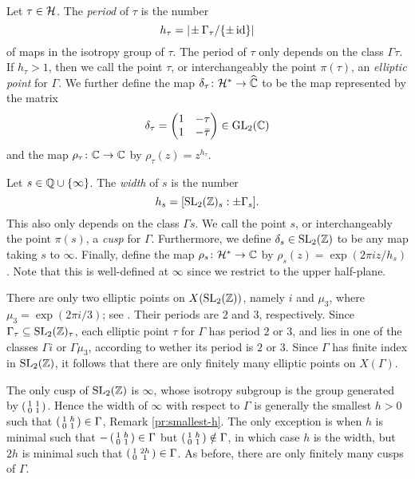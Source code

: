 \begin{defi} \label{df:period-width} \ 

  Let $\tau\in\mathcal{H}$. The \emph{period} of $\tau$ is the number \[h_\tau=|\!\pm\Gamma_\tau/\{\pm\operatorname{id}\}|\] of maps in the isotropy group of $\tau$. The period of $\tau$ only depends on the class $\Gamma\tau$. If $h_\tau > 1$, then we call the point $\tau$, or interchangeably the point $\pi(\tau)$, an \emph{elliptic point} for $\Gamma$. We further define the map $\delta_\tau\colon\mathcal{H}^*\to\widehat{\mathbb{C}}$ to be the map represented by the matrix
 \[\delta_\tau = \begin{pmatrix}1 & -\tau \\ 1 & -\bar{\tau}\end{pmatrix}\in\operatorname{GL}_2(\mathbb{C})\] and the map $\rho_\tau\colon\mathbb{C}\to\mathbb{C}$ by $\rho_\tau(z)=z^{h_\tau}.$
 
  Let $s\in\mathbb{Q}\cup\{\infty\}$. The \emph{width} of $s$ is the number \[h_s=[\operatorname{SL}_2(\mathbb{Z})_s:\pm\Gamma_s].\] This also only depends on the class $\Gamma s$. We call the point $s$, or interchangeably the point $\pi(s)$, a \emph{cusp} for $\Gamma$. Furthermore, we define $\delta_s\in\operatorname{SL}_2(\mathbb{Z})$ to be any map taking $s$ to $\infty$. Finally, define the map $\rho_s\colon\mathcal{H}^*\to\mathbb{C}$ by $\rho_s(z)=\exp(2\pi iz/h_s)$. Note that this is well-defined at $\infty$ since we restrict to the upper half-plane.
\end{defi}

\begin{rmk}
 There are only two elliptic points on $X(\operatorname{SL}_2(\mathbb{Z}))$, namely $i$ and $\mu_3$, where $\mu_3=\exp(2\pi i/3)$; see \cite[2.3]{Diamond-Shurman}. Their periods are $2$ and $3$, respectively. Since $\Gamma_\tau\subseteq\operatorname{SL}_2(\mathbb{Z})_\tau$, each elliptic point $\tau$ for $\Gamma$ has period $2$ or $3$, and lies in one of the classes $\Gamma i$ or $\Gamma \mu_3$, according to wether its period is $2$ or $3$. Since $\Gamma$ has finite index in $\operatorname{SL}_2(\mathbb{Z})$, it follows that there are only finitely many elliptic points on $X(\Gamma)$.
\end{rmk}

\begin{rmk} \label{pr:width}
 The only cusp of $\operatorname{SL}_2(\mathbb{Z})$ is $\infty$, whose isotropy subgroup is the group generated by $\left(\begin{smallmatrix}1&1\\0&1\end{smallmatrix}\right)$. Hence the width of $\infty$ with respect to $\Gamma$ is generally the smallest $h>0$ such that $\left(\begin{smallmatrix}1&h\\0&1\end{smallmatrix}\right)\in\Gamma$, \cf Remark \ref{pr:smallest-h}. The only exception is when $h$ is minimal such that $-\left(\begin{smallmatrix}1&h\\0&1\end{smallmatrix}\right)\in\Gamma$ but $\left(\begin{smallmatrix}1&h\\0&1\end{smallmatrix}\right)\notin\Gamma$, in which case $h$ is the width, but $2h$ is minimal such that $\left(\begin{smallmatrix}1&2h\\0&1\end{smallmatrix}\right)\in\Gamma$. As before, there are only finitely many cusps of $\Gamma$.
\end{rmk}

